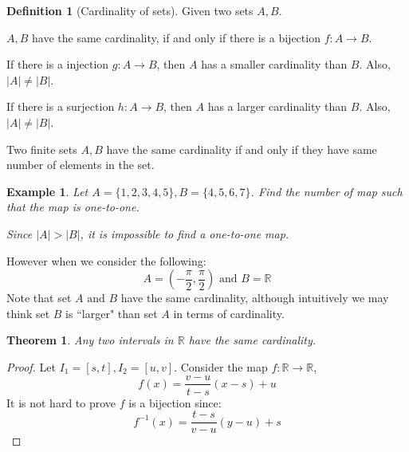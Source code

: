 \documentclass{article}
\theoremstyle{MyNonumberplain}
\theoremstyle{break}
\newtheorem*{proof}{Proof. }
\newcommand{\R}{\mathbb{R}}
\theoremstyle{break}
\newtheorem{theorem}{Theorem}[section]
\newtheorem{example}{Example}[section]
\theoremstyle{break}
\theoremstyle{definition}
\theoremstyle{break}
\newtheorem{definition}{Definition}[section]
\begin{document}
\begin{defbox}
    \begin{definition}[Cardinality of sets]
        Given two sets $A,B$.\bigskip

        $A,B$ have the same cardinality, if and only if there is a bijection $f:A\to B$.\bigskip

        If there is a injection $g:A\to B$, then $A$ has a smaller cardinality than $B$. Also, $|A|\neq |B|$.\bigskip

        If there is a surjection $h:A\to B$, then $A$ has a larger cardinality than $B$. Also, $|A|\neq |B|$.\bigskip

        Two finite sets $A,B$ have the same cardinality if and only if they have same number of elements in the set. 
    \end{definition}
\end{defbox}

\begin{expbox}
    \begin{example}
        Let $A=\{1,2,3,4,5\},B=\{4,5,6,7\}$. Find the number of map such that the map is one-to-one.\bigskip

        Since $|A| > |B|$, it is impossible to find a one-to-one map.    
    \end{example}
\end{expbox}

However when we consider the following:
\[ A = \left( - \frac{\pi}{2}, \frac{\pi}{2} \right) \text{ and } B = \mathbb{R}
\]
Note that set $A \text{ and } B$ have the same cardinality, although intuitively we may think
set $B$ is ``larger" than set $A$ in terms of cardinality.

\begin{thmbox}
    \begin{theorem}
        Any two intervals in $\R$ have the same cardinality.
    \end{theorem}
    \begin{prfbox}
        \begin{proof}
            Let $I_1=[s,t], I_2=[u,v]$. Consider the map $f:\R\to\R$,
            $$f(x)=\frac{v-u}{t-s}(x-s)+u$$
        It is not hard to prove $f$ is a bijection since:
            $$f^{-1}(x)=\frac{t-s}{v-u}(y-u)+s$$
        \end{proof}
    \end{prfbox}
\end{thmbox}
\end{document}
